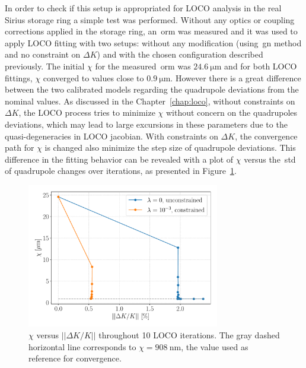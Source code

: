 In order to check if this setup is appropriated for LOCO analysis in the real Sirius storage ring a simple test was performed. Without any optics or coupling corrections applied in the storage ring, an~\gls{orm} was measured and it was used to apply LOCO fitting with two setups: without any modification (using~\gls{gn} method and no constraint on $\Delta K$) and with the chosen configuration described previously. The initial $\chi$ for the measured~\gls{orm} was $\SI{24.6}{\micro\meter}$ and for both LOCO fittings, $\chi$ converged to values close to $\SI{0.9}{\micro\meter}$. However there is a great difference between the two calibrated models regarding the quadrupole deviations from the nominal values. As discussed in the Chapter~\ref{chap:loco}, without constraints on $\Delta K$, the LOCO process tries to minimize $\chi$ without concern on the quadrupoles deviations, which may lead to large excursions in these parameters due to the quasi-degeneracies in LOCO jacobian. With constraints on $\Delta K$, the convergence path for $\chi$ is changed also minimize the step size of quadrupole deviations. This difference in the fitting behavior can be revealed with a plot of $\chi$ versus the~\gls{std} of quadrupole changes over iterations, as presented in Figure~\ref{fig:chi_vs_dkl}.
\begin{figure}
\centering
\includegraphics[width=0.75\textwidth]{figures/chi_versus_dk_cumsum.pdf}
\caption{$\chi$ versus $||\Delta K/K||$ throughout 10 LOCO iterations. The gray dashed horizontal line corresponds to $\chi = \SI{908}{\nano\meter}$, the value used as reference for convergence.}
\label{fig:chi_vs_dkl}
\end{figure}

